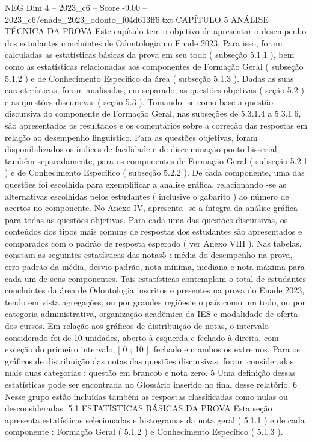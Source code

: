 \begin{textsample}{NEG Dim 4 – 2023\_c6 – Score -9.00 – 2023\_c6/enade\_2023\_odonto\_f04d613ff6.txt}  \label{ex:f4_neg_012}
CAPÍTULO 5 ANÁLISE TÉCNICA DA PROVA Este capítulo tem o objetivo de apresentar o desempenho dos estudantes concluintes de Odontologia no Enade 2023.
Para isso, foram calculadas as estatísticas básicas da prova em seu todo ( subseção 5.1.1 ), bem como as estatísticas relacionadas aos componentes de Formação Geral ( subseção 5.1.2 ) e de Conhecimento Específico da área ( subseção 5.1.3 ).
Dadas as suas características, foram analisadas, em separado, as questões objetivas ( seção 5.2 ) e as questões discursivas ( seção 5.3 ).
Tomando -se como base a questão discursiva do componente de Formação Geral, nas subseções de 5.3.1.4 a 5.3.1.6, são apresentados os resultados e os comentários sobre a correção das respostas em relação ao desempenho linguístico.
Para as questões objetivas, foram disponibilizados os índices de facilidade e de discriminação ponto-bisserial, também separadamente, para os componentes de Formação Geral ( subseção 5.2.1 ) e de Conhecimento Específico ( subseção 5.2.2 ).
De cada componente, uma das questões foi escolhida para exemplificar a análise gráfica, relacionando -se as alternativas escolhidas pelos estudantes ( inclusive o gabarito ) ao número de acertos no componente.
No Anexo IV, apresenta -se a íntegra da análise gráfica para todas as questões objetivas.
Para cada uma das questões discursivas, os conteúdos dos tipos mais comuns de respostas dos estudantes são apresentados e comparados com o padrão de resposta esperado ( ver Anexo VIII ).
Nas tabelas, constam as seguintes estatísticas das notas5 : média do desempenho na prova, erro-padrão da média, desvio-padrão, nota mínima, mediana e nota máxima para cada um de seus componentes.
Tais estatísticas contemplam o total de estudantes concluintes da área de Odontologia inscritos e presentes na prova do Enade 2023, tendo em vista agregações, ou por grandes regiões e o país como um todo, ou por categoria administrativa, organização acadêmica da IES e modalidade de oferta dos cursos.
Em relação aos gráficos de distribuição de notas, o intervalo considerado foi de 10 unidades, aberto à esquerda e fechado à direita, com exceção do primeiro intervalo, [ 0 ; 10 ], fechado em ambos os extremos.
Para os gráficos de distribuição das notas das questões discursivas, foram consideradas mais duas categorias : questão em branco6 e nota zero. 5 Uma definição dessas estatísticas pode ser encontrada no Glossário inserido no final desse relatório. 6 Nesse grupo estão incluídas também as respostas classificadas como nulas ou desconsideradas. 5.1 ESTATÍSTICAS BÁSICAS DA PROVA Esta seção apresenta estatísticas selecionadas e histogramas da nota geral ( 5.1.1 ) e de cada componente : Formação Geral ( 5.1.2 ) e Conhecimento Específico ( 5.1.3 ).

\end{textsample}
